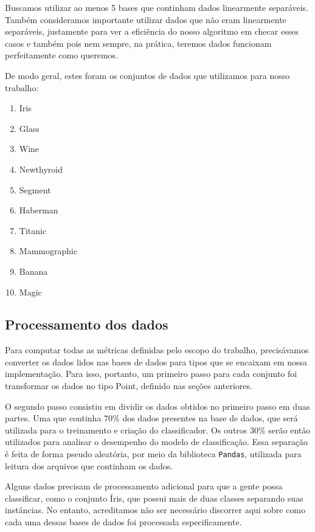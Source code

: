\documentclass{article}
\begin{document}
Buscamos utilizar ao menos 5 bases que continham dados linearmente separáveis. Também consideramos importante utilizar dados que não eram linearmente separáveis, justamente para ver a eficiência do nosso algoritmo em checar esses casos e também pois nem sempre, na prática, teremos dados funcionam perfeitamente como queremos.

De modo geral, estes foram os conjuntos de dados que utilizamos para nosso trabalho:

\begin{enumerate}
	\item Iris
	\item Glass
	\item Wine
	\item Newthyroid
	\item Segment
	\item Haberman
	\item Titanic
	\item Mammographic
	\item Banana
	\item Magic

\end{enumerate}

\subsection{Processamento dos dados}

Para computar todas as métricas definidas pelo escopo do trabalho, precisávamos converter os dados lidos nas bases de dados para tipos que se encaixam em nossa implementação. Para isso, portanto, um primeiro passo para cada conjunto foi transformar os dados no tipo Point, definido nas seções anteriores.

O segundo passo consistiu em dividir os dados obtidos no primeiro passo em duas partes. Uma que continha 70\% dos dados presentes na base de dados, que será utilizada para o treinamento e criação do classificador. Os outros 30\% serão então utilizados para analisar o desempenho do modelo de classificação. Essa separação é feita de forma pseudo aleatória, por meio da biblioteca \texttt{Pandas}, utilizada para leitura dos arquivos que continham os dados.

Alguns dados precisam de processamento adicional para que a gente possa classificar, como o conjunto Íris, que possui mais de duas classes separando suas instâncias. No entanto, acreditamos não ser necessário discorrer aqui sobre como cada uma dessas bases de dados foi processada especificamente.
\end{document}
